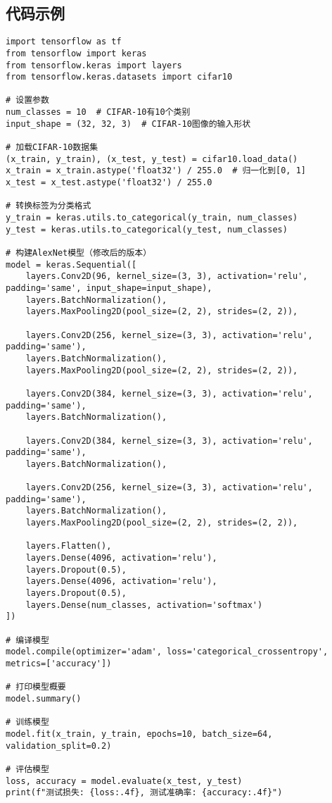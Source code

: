 \subsection*{代码示例}
\begin{lstlisting}
import tensorflow as tf
from tensorflow import keras
from tensorflow.keras import layers
from tensorflow.keras.datasets import cifar10

# 设置参数
num_classes = 10  # CIFAR-10有10个类别
input_shape = (32, 32, 3)  # CIFAR-10图像的输入形状

# 加载CIFAR-10数据集
(x_train, y_train), (x_test, y_test) = cifar10.load_data()
x_train = x_train.astype('float32') / 255.0  # 归一化到[0, 1]
x_test = x_test.astype('float32') / 255.0

# 转换标签为分类格式
y_train = keras.utils.to_categorical(y_train, num_classes)
y_test = keras.utils.to_categorical(y_test, num_classes)

# 构建AlexNet模型（修改后的版本）
model = keras.Sequential([
    layers.Conv2D(96, kernel_size=(3, 3), activation='relu', padding='same', input_shape=input_shape),
    layers.BatchNormalization(),
    layers.MaxPooling2D(pool_size=(2, 2), strides=(2, 2)),

    layers.Conv2D(256, kernel_size=(3, 3), activation='relu', padding='same'),
    layers.BatchNormalization(),
    layers.MaxPooling2D(pool_size=(2, 2), strides=(2, 2)),

    layers.Conv2D(384, kernel_size=(3, 3), activation='relu', padding='same'),
    layers.BatchNormalization(),

    layers.Conv2D(384, kernel_size=(3, 3), activation='relu', padding='same'),
    layers.BatchNormalization(),

    layers.Conv2D(256, kernel_size=(3, 3), activation='relu', padding='same'),
    layers.BatchNormalization(),
    layers.MaxPooling2D(pool_size=(2, 2), strides=(2, 2)),

    layers.Flatten(),
    layers.Dense(4096, activation='relu'),
    layers.Dropout(0.5),
    layers.Dense(4096, activation='relu'),
    layers.Dropout(0.5),
    layers.Dense(num_classes, activation='softmax')
])

# 编译模型
model.compile(optimizer='adam', loss='categorical_crossentropy', metrics=['accuracy'])

# 打印模型概要
model.summary()

# 训练模型
model.fit(x_train, y_train, epochs=10, batch_size=64, validation_split=0.2)

# 评估模型
loss, accuracy = model.evaluate(x_test, y_test)
print(f"测试损失: {loss:.4f}, 测试准确率: {accuracy:.4f}")

\end{lstlisting}


